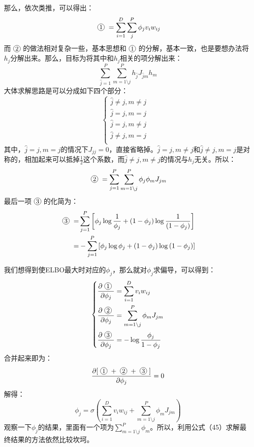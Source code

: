 \documentclass[a4paper]{article}
\newcommand*{\circled}[1]{\lower.7ex\hbox{\tikz\draw (0pt, 0pt)%
    circle (.5em) node {\makebox[1em][c]{\small #1}};}}
\begin{document}
那么，依次类推，可以得出：
\begin{equation}
    \circled{1} = \sum_{i=1}^D  \sum_{j}^P \phi_{j}v_iw_{ij}
\end{equation}
而$\circled{2}$的做法相对复杂一些，基本思想和$\circled{1}$的分解，基本一致，也是要想办法将$h_j$分解出来。那么，目标为将其中和$h_j$相关的项分解出来：
\begin{equation}
    \sum_{\hat{j}=1}^{P} \sum_{m=1\setminus j}^{P} h_{\hat{j}} J_{\hat{j}m} h_{m} 
\end{equation}
大体求解思路是可以分成如下四个部分：
\begin{equation}
    \left\{
    \begin{array}{ll}
      \hat{j} \neq j, m \neq j &\\
      \hat{j} = j, m = j & \\
      \hat{j} = j, m \neq j & \\
      \hat{j} \neq j, m = j & \\
    \end{array}
    \right.
\end{equation}
其中，$\hat{j} = j, m = j$的情况下$J_{jj}=0$，直接省略掉。$\hat{j} = j, m \neq j$和$\hat{j} \neq j, m = j$是对称的，相加起来可以抵掉$\frac{1}{2}$这个系数，而$\hat{j} \neq j, m \neq j$的情况与$h_j$无关。所以：
\begin{equation}
    \circled{2} = \sum_{j=1}^{P} \sum_{m=1\setminus j}^{P} \phi_{j} \phi_{m} J_{jm}
\end{equation}
最后一项$\circled{3}$的化简为：
\begin{equation}
    \begin{split}
        \circled{3}= &\sum_{j=1}^{P}\left[\phi_{j} \log\frac{1}{ \phi_{j}}+\left(1-\phi_{j}\right) \log \frac{1}{\left(1-\phi_{j}\right)}\right]  \\
        = &-\sum_{j=1}^{P}\left[\phi_{j} \log \phi_{j}+\left(1-\phi_{j}\right) \log \left(1-\phi_{j}\right)\right] 
    \end{split}
\end{equation}

我们想得到使ELBO最大时对应的$\phi_j$，那么就对$\phi_j$求偏导，可以得到：
\begin{equation}\left\{\begin{aligned}
&\frac{\partial \circled{1}}{\partial \phi_{j}}=\sum_{i=1}^{D} v_{i} w_{i j}\\
&\frac{\partial \circled{2}}{\partial \phi_{j}}=\sum_{m=1\setminus j}^{P} \phi_{m} J_{j m}\\
&\frac{\partial \circled{3}}{\partial \phi_{j}}= -\log \frac{\phi_{j}}{1-\phi_{j}}
\end{aligned}\right.\end{equation}
合并起来即为：
$$\frac{\partial[ \circled{1} + \circled{2} + \circled{3} ]}{\partial \phi_{j}} = 0$$
解得：
\begin{equation}
    \phi_{j} = \sigma\left( \sum_{i=1}^{D} v_{i} w_{i j} + \sum_{m=1\setminus j}^{P} \phi_{m} J_{j m} \right)
\end{equation}
观察一下$\phi_{j}$的结果，里面有一个项为$\sum_{m=1\setminus j}^{P} \phi_{m}$。所以，利用公式（45）求解最终结果的方法依然比较坎坷。
\end{document}
